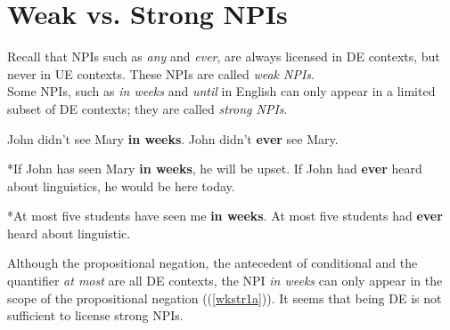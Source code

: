 \documentclass[a4paper,11pt]{article}
\newcommand{\reff}[1]{(\ref{#1})}
\begin{document}
\section{Weak vs. Strong NPIs}



Recall that NPIs such as \textit{any} and \textit{ever}, are always licensed in DE contexts, but never in UE contexts. These NPIs are called \textit{weak NPIs}. 
\\Some NPIs, such as \textit{in weeks} and \textit{until} in English can only appear in a limited subset of DE contexts; they are called \textit{strong NPIs}.
\begin{exe}
\ex\label{wkstr} \begin{xlist}
\ex\label{wkstr1} \begin{xlist}
\ex\label{wkstr1a} John didn't see Mary \textbf{in weeks}. 
\ex\label{wkstr1b} John didn't \textbf{ever} see Mary. 
\end{xlist}
\ex\label{wkstr2} \begin{xlist}
\ex\label{wkstr2a} *If John has seen Mary \textbf{in weeks}, he will be upset.
\ex\label{wkstr2b} If John had \textbf{ever} heard about linguistics, he would be here today.
\end{xlist}
\ex\label{wkstr3} \begin{xlist}
\ex\label{wkstr3a} *At most five students have seen me \textbf{in weeks}.
\ex\label{wkstr3b} At most five students had \textbf{ever} heard about linguistic.
\end{xlist}
\end{xlist}
\end{exe}
Although the propositional negation, the antecedent of conditional and the quantifier \textit{at most} are all DE contexts, the NPI \textit{in weeks} can only appear in the scope of the propositional negation (\reff{wkstr1a}). It seems that being DE is not sufficient to license strong NPIs.
\end{document}
